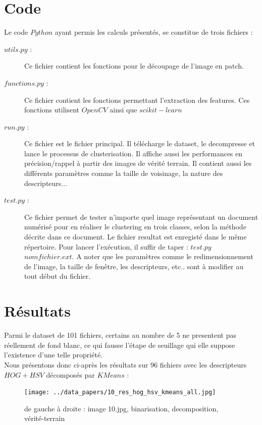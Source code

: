 \documentclass{book}
\begin{document}
\chapter{Code}

Le code $Python$ ayant permis les calculs présentés, se constitue de trois fichiers :
\begin{description} %

\item[$utils.py$ :] Ce fichier contient les fonctions pour le découpage de l'image en patch.
\item[$functions.py$ :] Ce fichier contient les fonctions permettant l'extraction des features. Ces fonctions utilisent $OpenCV$ \cite{opencv_library} ainsi que $scikit-learn$ \cite{scikit-learn}
\item[$run.py$ :] Ce fichier est le fichier principal. Il télécharge le dataset, le decompresse et lance le processus de clusterisation. Il affiche aussi les performances
en précision/rappel à partir des images de vérité terrain. Il contient aussi les différents paramètres comme la taille de voisinage, la nature des descripteurs...
\item[$test.py$ :] Ce fichier permet de tester n'importe quel image représentant un document numérisé pour en réaliser le clustering 
en trois classes, selon la méthode décrite dans ce document. Le fichier resultat est enregisté dans le même répertoire. Pour lancer
l'exécution, il suffir de taper : $test.py$ $nomfichier.ext$. A noter que les paramètres comme le redimensionnement de l'image, la taille
de fenêtre, les descripteurs, etc.. sont à modifier au tout début du fichier.

\end{description}


\chapter{Résultats}

Parmi le dataset de 101 fichiers, certains au nombre de 5 ne presentent pas réellement de fond blanc, ce qui fausse l'étape de seuillage qui elle suppose l'existence d'une telle
propriété.\\
Nous présentons donc ci-après les résultats sur 96 fichiers avec les descripteurs $HOG+HSV$ décomposés par $KMeans$ :\\

\begin{figure}[H]
\begin{center}
\texttt{[image: ../data\_papers/10\_res\_hog\_hsv\_kmeans\_all.jpg]}
\end{center}
\caption{de gauche à droite : image 10.jpg, binarisation, decomposition, vérité-terrain}
\label{10}
\end{figure}
\clearpage
\end{document}

